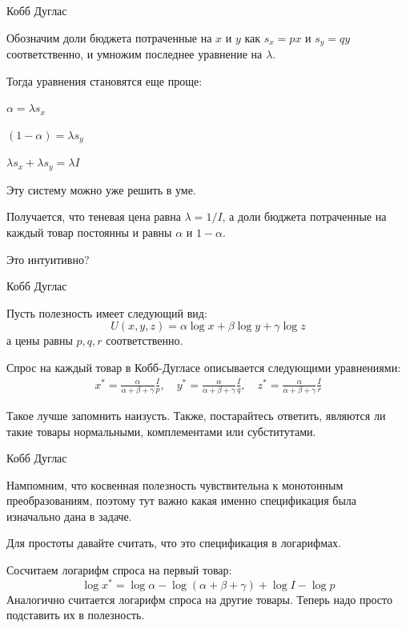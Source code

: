 \documentclass{beamer}
\begin{document}
\begin{frame}{Кобб Дуглас}

Обозначим доли бюджета потраченные на $x$ и $y$ как $s_x= px$ и $s_y = qy$ соответственно, и умножим последнее уравнение на $\lambda$. 

Тогда уравнения становятся еще проще:

$\alpha = \lambda s_x$

$(1-\alpha) = \lambda s_y$

$\lambda s_x + \lambda s_y = \lambda I$

Эту систему можно уже решить в уме. 

Получается, что теневая цена равна $\lambda = 1/I$, а доли бюджета потраченные на каждый товар постоянны и равны $\alpha$ и $1-\alpha$.

Это интуитивно?

\end{frame}

\begin{frame}{Кобб Дуглас}

Пусть полезность имеет следующий вид:
$$U(x,y,z) = \alpha \log x + \beta \log y + \gamma \log z$$ 
а цены равны $p, q, r$ соответственно.

Спрос на каждый товар в Кобб-Дугласе описывается следующими уравнениями:
\begin{gather*}
x^{\ast} = \frac{\alpha}{\alpha + \beta + \gamma} \frac{I}{p}, \quad
y^{\ast} = \frac{\alpha}{\alpha + \beta + \gamma} \frac{I}{q}, \quad
z^{\ast} = \frac{\alpha}{\alpha + \beta + \gamma} \frac{I}{r}
\end{gather*}

Такое лучше запомнить наизусть. Также, постарайтесь ответить, являются ли такие товары нормальными, комплементами или субститутами.

\end{frame}

\begin{frame}{Кобб Дуглас}

Нампомним, что косвенная полезность чувствительна к монотонным преобразованиям, поэтому тут важно какая именно спецификация была изначально дана в задаче. 

Для простоты давайте считать, что это спецификация в логарифмах.

Сосчитаем логарифм спроса на первый товар:
$$\log x^{\ast} = \log \alpha - \log (\alpha + \beta + \gamma) + \log I - \log p$$
Аналогично считается логарифм спроса на другие товары. Теперь надо просто подставить их в полезность.

\end{frame}
\end{document}
